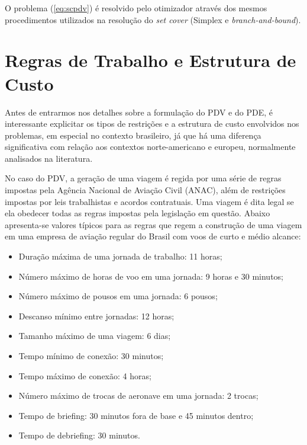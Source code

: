 O problema (\ref{eq:scpdv}) é resolvido pelo otimizador através dos mesmos procedimentos utilizados 
na resolução do {\it set cover} (Simplex e {\it branch-and-bound}). 


\section{Regras de Trabalho e Estrutura de Custo}
\label{sec:regras_e_custos}

Antes de entrarmos nos detalhes sobre a formulação do PDV e do PDE, é interessante explicitar os 
tipos de restrições e a estrutura de custo envolvidos nos problemas, em especial no contexto 
brasileiro, já que há uma diferença significativa com relação aos contextos norte-americano e 
europeu, normalmente analisados na literatura.

No caso do PDV, a geração de uma viagem é regida por uma série de regras impostas pela Agência
Nacional de Aviação Civil (ANAC), além de restrições impostas por leis trabalhistas e acordos
contratuais. Uma viagem é dita legal se ela obedecer todas as regras impostas pela legislação em
questão. Abaixo apresenta-se valores típicos para as regras que regem a construção de uma viagem em
uma empresa de aviação regular do Brasil com voos de curto e médio alcance:

\begin{itemize}
	\item Duração máxima de uma jornada de trabalho: 11 horas;
	\item Número máximo de horas de voo em uma jornada: 9 horas e 30 minutos;
	\item Número máximo de pousos em uma jornada: 6 pousos;
	\item Descanso mínimo entre jornadas: 12 horas;
	\item Tamanho máximo de uma viagem: 6 dias;
	\item Tempo mínimo de conexão: 30 minutos;
	\item Tempo máximo de conexão: 4 horas;
	\item Número máximo de trocas de aeronave em uma jornada: 2 trocas;
	\item Tempo de briefing: 30 minutos fora de base e 45 minutos dentro;
	\item Tempo de debriefing: 30 minutos.
\end{itemize}

